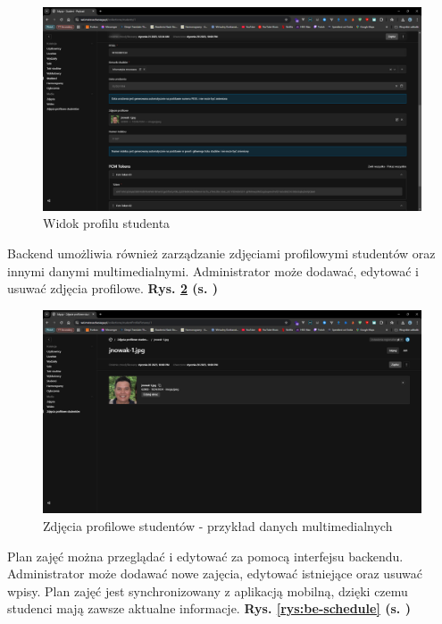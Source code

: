 \begin{figure}[htp!]
	\centering
	\includegraphics[width=\textwidth]{rys/be-student.png}
	\caption{Widok profilu studenta}
	\label{rys:be-student-profile}
\end{figure}
\newpage
Backend umożliwia również zarządzanie zdjęciami profilowymi studentów oraz innymi danymi multimedialnymi. Administrator może dodawać, edytować i usuwać zdjęcia profilowe. \textbf{Rys. \ref{rys:be-student-profi-pics} (s. \pageref{rys:be-student-profi-pics})}

\begin{figure}[htp!]
	\centering
	\includegraphics[width=\textwidth]{rys/be-student-prof-picture.png}
	\caption{Zdjęcia profilowe studentów - przykład danych multimedialnych}
	\label{rys:be-student-profi-pics}
\end{figure}

Plan zajęć można przeglądać i edytować za pomocą interfejsu backendu. Administrator może dodawać nowe zajęcia, edytować istniejące oraz usuwać wpisy. Plan zajęć jest synchronizowany z aplikacją mobilną, dzięki czemu studenci mają zawsze aktualne informacje. \textbf{Rys. \ref{rys:be-schedule} (s. \pageref{rys:be-schedule})}

